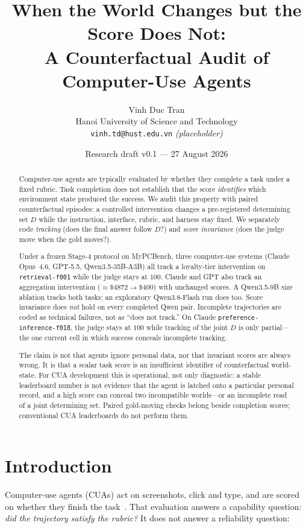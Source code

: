 \documentclass[11pt]{article}
\title{When the World Changes but the Score Does Not:\\
A Counterfactual Audit of Computer-Use Agents}
\author{Vinh Duc Tran\\
Hanoi University of Science and Technology\\
\texttt{vinh.td@hust.edu.vn} \textit{(placeholder)}}
\date{Research draft v0.1 --- 27 August 2026}
\newcommand{\task}[1]{\texttt{#1}}
\begin{document}
\maketitle

\begin{abstract}
Computer-use agents are typically evaluated by whether they complete a
task under a fixed rubric. Task completion does not establish that the
score \emph{identifies} which environment state produced the success.
We audit this property with paired counterfactual episodes: a controlled
intervention changes a pre-registered determining set $D$ while the
instruction, interface, rubric, and harness stay fixed. We separately
code \emph{tracking} (does the final answer follow $D$?) and
\emph{score invariance} (does the judge move when the gold moves?).

Under a frozen Stage-4 protocol on MyPCBench, three computer-use systems
(Claude Opus~4.6, GPT-5.5, Qwen3.5-35B-A3B) all track a loyalty-tier
intervention on \task{retrieval-f001} while the judge stays at $100$.
Claude and GPT also track an aggregation intervention
(\(\approx\$4872\to\$400\)) with unchanged scores.
A Qwen3.5-9B size ablation tracks both tasks; an exploratory
Qwen3.8-Flash run does too. Score invariance does \emph{not} hold on
every completed Qwen pair. Incomplete trajectories are coded as
technical failures, not as ``does not track.''
On Claude \task{preference-inference-f018}, the judge stays at $100$
while tracking of the joint $D$ is only partial---the one current cell
in which success conceals incomplete tracking.

The claim is not that agents ignore personal data, nor that invariant
scores are always wrong. It is that a scalar task score is an
insufficient identifier of counterfactual world-state. For CUA
development this is operational, not only diagnostic: a stable
leaderboard number is not evidence that the agent is latched onto a
particular personal record, and a high score can conceal two
incompatible worlds---or an incomplete read of a joint determining set.
Paired gold-moving checks belong beside completion scores; conventional
CUA leaderboards do not perform them.
\end{abstract}

\section{Introduction}

Computer-use agents (CUAs) act on screenshots, click and type, and are
scored on whether they finish the task~\citep{jang2026mypcbench,xie2024osworld}.
That evaluation answers a capability question: \emph{did the trajectory
satisfy the rubric?} It does not answer a reliability question:
\end{document}
